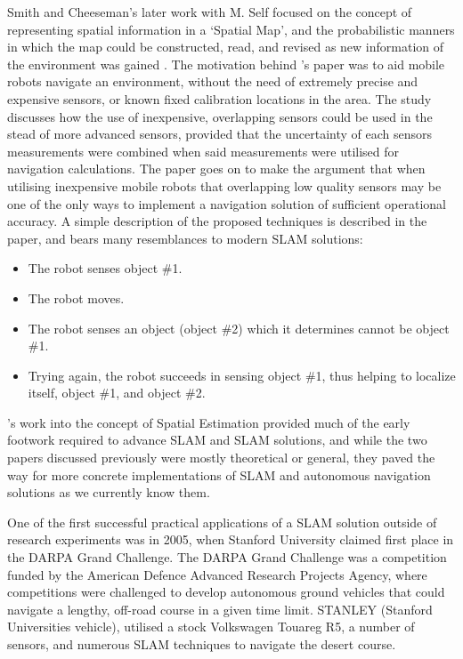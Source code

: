 Smith and Cheeseman's later work with M. Self focused on the concept of
representing spatial information in a `Spatial Map', and the probabilistic
manners in which the map could be constructed, read, and revised as new
information of the environment was gained \cite{Smith1988}.
The motivation behind \citeauthor{Smith1988}'s paper was to aid mobile robots
navigate an environment, without the need of extremely precise and expensive
sensors, or known fixed calibration locations in the area.
The study discusses how the use of inexpensive, overlapping sensors could be
used in the stead of more advanced sensors, provided that the uncertainty of
each sensors measurements were combined when said measurements were utilised
for navigation calculations.
The paper goes on to make the argument that when utilising inexpensive mobile
robots that overlapping low quality sensors may be one of the only ways to
implement a navigation solution of sufficient operational accuracy.
A simple description of the proposed techniques is described in the paper, and
bears many resemblances to modern SLAM solutions:

\begin{itemize}
    \item The robot senses object \#1.
    \item The robot moves. 
    \item The robot senses an object (object \#2) which it determines cannot be
    object \#1.
    \item Trying again, the robot succeeds in sensing object \#1, thus helping
    to localize itself, object \#1, and object \#2.
\end{itemize}

\citeauthor*{Smith1988}'s work into the concept of Spatial Estimation
provided much of the early footwork required to advance SLAM and SLAM
solutions, and while the two papers discussed previously were mostly
theoretical or general, they paved the way for more concrete implementations
of SLAM and autonomous navigation solutions as we currently know them.

One of the first successful practical applications of a SLAM solution outside of
research experiments was in 2005, when Stanford University claimed first
place in the DARPA Grand Challenge.
The DARPA Grand Challenge was a competition funded by the American Defence
Advanced Research Projects Agency, where competitions were challenged to
develop autonomous ground vehicles that could navigate a lengthy, off-road
course in a given time limit. 
STANLEY (Stanford Universities vehicle), utilised a stock Volkswagen
Touareg R5, a number of sensors, and numerous SLAM techniques to navigate the
desert course.

